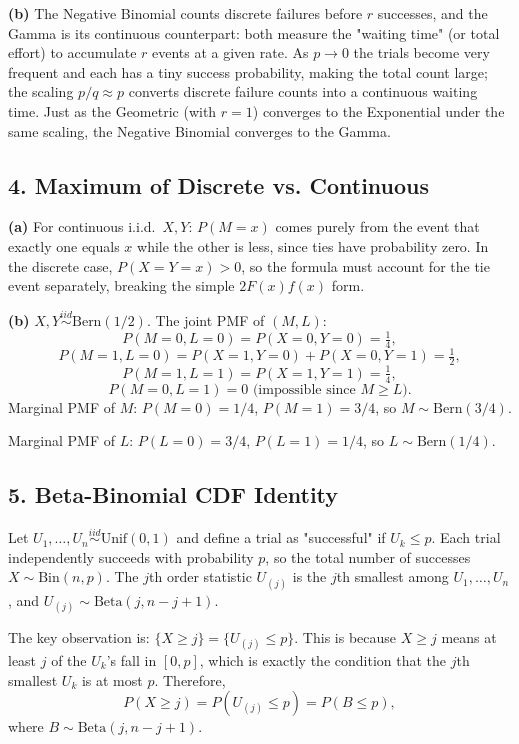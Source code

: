 \documentclass{article}
\begin{document}
\textbf{(b)} The Negative Binomial counts discrete failures before $r$ successes, and the Gamma is its continuous counterpart: both measure the "waiting time" (or total effort) to accumulate $r$ events at a given rate. As $p\to0$ the trials become very frequent and each has a tiny success probability, making the total count large; the scaling $p/q\approx p$ converts discrete failure counts into a continuous waiting time. Just as the Geometric (with $r=1$) converges to the Exponential under the same scaling, the Negative Binomial converges to the Gamma.

\subsection*{4. Maximum of Discrete vs. Continuous}

\textbf{(a)} For continuous i.i.d.\ $X,Y$: $P(M=x)$ comes purely from the event that exactly one equals $x$ while the other is less, since ties have probability zero. In the discrete case, $P(X=Y=x)>0$, so the formula must account for the tie event separately, breaking the simple $2F(x)f(x)$ form.

\textbf{(b)} $X,Y\overset{iid}{\sim}\text{Bern}(1/2)$. The joint PMF of $(M,L)$:
$$
P(M=0,L=0)=P(X=0,Y=0)=\tfrac{1}{4},
$$
$$
P(M=1,L=0)=P(X=1,Y=0)+P(X=0,Y=1)=\tfrac{1}{2},
$$
$$
P(M=1,L=1)=P(X=1,Y=1)=\tfrac{1}{4},
$$
$$
P(M=0,L=1)=0 \text{ (impossible since }M\ge L\text{)}.
$$
Marginal PMF of $M$: $P(M=0)=1/4$, $P(M=1)=3/4$, so $M\sim\text{Bern}(3/4)$.

Marginal PMF of $L$: $P(L=0)=3/4$, $P(L=1)=1/4$, so $L\sim\text{Bern}(1/4)$.

\subsection*{5. Beta-Binomial CDF Identity}

Let $U_1,\dots,U_n\overset{iid}{\sim}\text{Unif}(0,1)$ and define a trial as "successful" if $U_k\le p$. Each trial independently succeeds with probability $p$, so the total number of successes $X\sim\text{Bin}(n,p)$. The $j$th order statistic $U_{(j)}$ is the $j$th smallest among $U_1,\dots,U_n$, and $U_{(j)}\sim\text{Beta}(j,n-j+1)$.

The key observation is: $\{X\ge j\}=\{U_{(j)}\le p\}$. This is because $X\ge j$ means at least $j$ of the $U_k$'s fall in $[0,p]$, which is exactly the condition that the $j$th smallest $U_k$ is at most $p$. Therefore,
$$
P(X\ge j) = P(U_{(j)}\le p) = P(B\le p),
$$
where $B\sim\text{Beta}(j,n-j+1)$.
\end{document}
